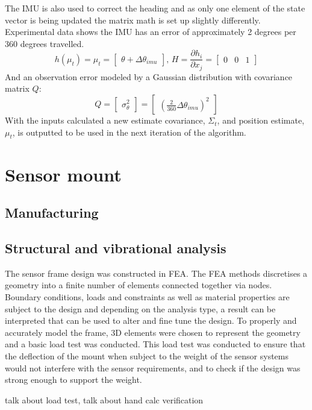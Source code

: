 \documentclass[main.tex]{subfiles}
\begin{document}
The IMU is also used to correct the heading and as only one element of the state vector is being updated the matrix math is set up slightly differently. Experimental data shows the IMU has an error of approximately 2 degrees per 360 degrees travelled. 
\[
h(\mu_t) = \mu_t = 
\begin{bmatrix}
    \theta + \Delta \theta_{imu}
\end{bmatrix}
\textrm{, } H = \frac{\partial h_i}{\partial x_j} = 
\begin{bmatrix}
    0	&	0	&	1
\end{bmatrix}
\]
And an observation error modeled by a Gaussian distribution with covariance matrix $Q$:
\[
Q = 
\begin{bmatrix}
    \sigma_\theta^2
\end{bmatrix}
=
\begin{bmatrix}
    (\frac{2}{360}\Delta \theta_{imu})^2
\end{bmatrix}
\]
With the inputs calculated a new estimate covariance, $\Sigma_t$, and position estimate, $\mu_t$, is outputted to be used in the next iteration of the algorithm. 

\section{Sensor mount}
\subsection{Manufacturing}
\subsection{Structural and vibrational analysis}
The sensor frame design was constructed in FEA. The FEA methods discretises a geometry into a finite number of elements connected together via nodes. Boundary conditions, loads and constraints as well as material properties are subject to the design and depending on the analysis type, a result can be interpreted that can be used to alter and fine tune the design.  To properly and accurately model the frame, 3D elements were chosen to represent the geometry and a basic load test was conducted. This load test was conducted to ensure that the deflection of the mount when subject to the weight of the sensor systems would not interfere with the sensor requirements, and to check if the design was strong enough to support the weight. 

talk about load test, talk about hand calc verification
\end{document}
